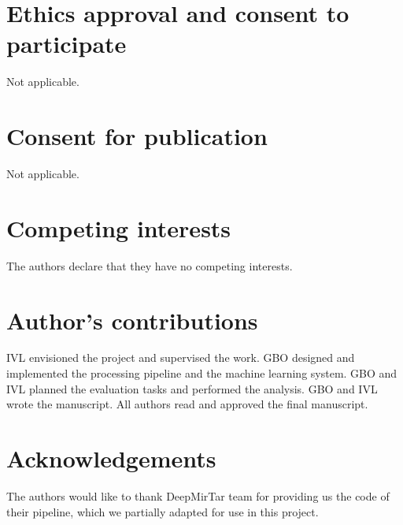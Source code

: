 \documentclass{bmcart}
\begin{document}
\begin{backmatter}

\section*{Ethics approval and consent to participate}
Not applicable.

\section*{Consent for publication}
Not applicable.

\section*{Competing interests}
  The authors declare that they have no competing interests.

\section*{Author's contributions}
   IVL envisioned the project and supervised the work. GBO designed and implemented the processing pipeline and the machine learning system. GBO and IVL planned the evaluation tasks and performed the analysis. GBO and IVL wrote the manuscript.  All authors read and approved the final manuscript.
    
\section*{Acknowledgements}
  The authors would like to thank DeepMirTar team for providing us the code of their pipeline, which we partially adapted for use in this project.
 
 


\end{backmatter}
\end{document}
